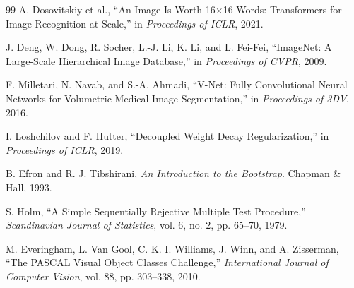 \documentclass[11pt]{article}
\begin{document}
\begin{thebibliography}{99}
A. Dosovitskiy et al., ``An Image Is Worth 16$\times$16 Words: Transformers for Image Recognition
at Scale,'' in \emph{Proceedings of ICLR}, 2021.

J. Deng, W. Dong, R. Socher, L.-J. Li, K. Li, and L. Fei-Fei, ``ImageNet: A Large-Scale Hierarchical
Image Database,'' in \emph{Proceedings of CVPR}, 2009.

F. Milletari, N. Navab, and S.-A. Ahmadi, ``V-Net: Fully Convolutional Neural Networks for
Volumetric Medical Image Segmentation,'' in \emph{Proceedings of 3DV}, 2016.

I. Loshchilov and F. Hutter, ``Decoupled Weight Decay Regularization,'' in \emph{Proceedings of
ICLR}, 2019.

B. Efron and R. J. Tibshirani, \emph{An Introduction to the Bootstrap}. Chapman \& Hall, 1993.

S. Holm, ``A Simple Sequentially Rejective Multiple Test Procedure,'' \emph{Scandinavian Journal
of Statistics}, vol. 6, no. 2, pp. 65--70, 1979.

M. Everingham, L. Van Gool, C. K. I. Williams, J. Winn, and A. Zisserman, ``The PASCAL Visual
Object Classes Challenge,'' \emph{International Journal of Computer Vision}, vol. 88, pp. 303--338,
2010.

\end{thebibliography}
\end{document}
